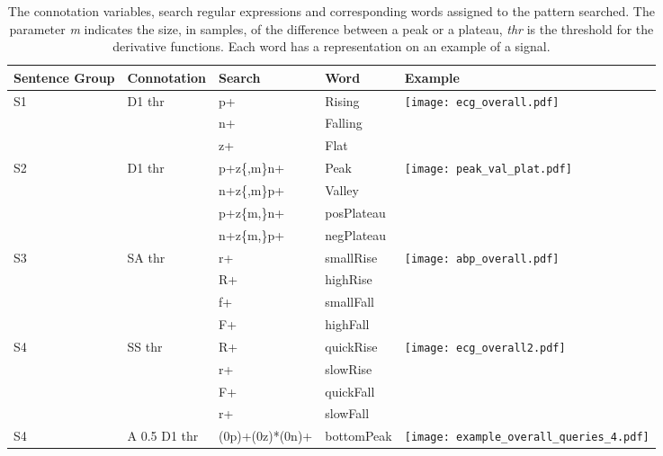 \begin{table}
\begin{center}
\caption{The connotation variables, search regular expressions and corresponding words assigned to the pattern searched. The parameter \textit{m} indicates the size, in samples, of the difference between a peak or a plateau, \textit{thr} is the threshold for the derivative functions. Each word has a representation on an example of a signal.}
\renewcommand{\arraystretch}{1.2}
\begin{tabularx}{\linewidth}{ XXXXX } 
\toprule[1.5pt]
Sentence Group & Connotation & Search & Word & Example\\
\toprule
  \multirow{3}{1em}{S1} & \multirow{3}{3em}{D1 thr} & p+ & \textcolor{mygreen2}{Rising} &  \multirow{3}{9em}{\texttt{[image: ecg\_overall.pdf]}}\\ 
  & & n+ & \textcolor{myblue2}{Falling} & \\ 
  & & z+ & \textcolor{myorange}{Flat} & \\
\hline
 \multirow{4}{1em}{S2} & \multirow{4}{6em}{D1 thr} & p+z\{,m\}n+ & \textcolor{myblue2}{Peak} & \multirow{4}{9em}{\texttt{[image: peak\_val\_plat.pdf]}}\\
 & & n+z\{,m\}p+ & \textcolor{myorange}{Valley}\\
 & & p+z\{m,\}n+ & \textcolor{mypurple}{posPlateau}\\
 & & n+z\{m,\}p+ & \textcolor{mygreen2}{negPlateau}\\
\hline
\multirow{4}{1em}{S3} & \multirow{4}{6em}{SA thr} & r+ & \textcolor{mypurple}{smallRise} & \multirow{4}{9em}{\texttt{[image: abp\_overall.pdf]}}\\
 & & R+ & \textcolor{myblue2}{highRise}\\
 & & f+ & \textcolor{mygreen2}{smallFall}\\
 & & F+ & \textcolor{myorange}{highFall}\\
\hline
\multirow{4}{1em}{S4} & \multirow{4}{6em}{SS thr} & R+ & \textcolor{mygreen2}{quickRise} & \multirow{4}{9em}{\texttt{[image: ecg\_overall2.pdf]}}\\
  & & r+ & \textcolor{mypurple}{slowRise}\\
  & & F+ & \textcolor{myblue2}{quickFall}\\
 & & r+ & \textcolor{myorange}{slowFall}\\
\hline
\multirow{4}{1em}{S4} & \multirow{4}{6em}{A 0.5 D1 thr} & (0p)+(0z)*(0n)+ & \textcolor{mygreen2}{bottomPeak} & \multirow{4}{9em}{\texttt{[image: example\_overall\_queries\_4.pdf]}}\\

\end{tabularx}
\end{center}
\end{table}
